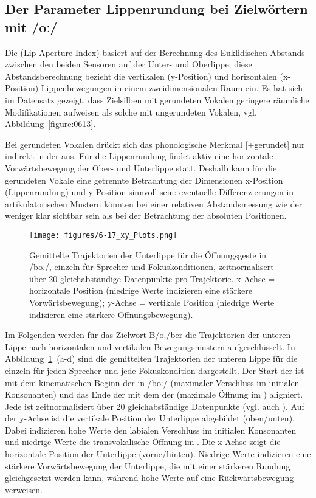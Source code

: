 \subsection{Der Parameter Lippenrundung bei Zielwörtern mit /oː/}
\label{subsec:060305}

Die  (Lip-Aperture-Index) basiert auf der Berechnung des Euklidischen Abstands zwischen den beiden Sensoren auf der Unter- und Oberlippe; diese Abstandsberechnung bezieht die vertikalen (y-Position) und horizontalen (x-Position) Lippenbewegungen in einem zweidimensionalen Raum ein. Es hat sich im Datensatz gezeigt, dass Zielsilben mit gerundeten Vokalen geringere räumliche Modifikationen aufweisen als solche mit ungerundeten Vokalen, vgl. Abbildung~\ref{figure:0613}.

Bei gerundeten Vokalen drückt sich das phonologische Merkmal [+gerundet] nur indirekt in der  aus. Für die Lippenrundung findet aktiv eine horizontale Vorwärtsbewegung der Ober- und Unterlippe statt. Deshalb kann für die gerundeten Vokale eine getrennte Betrachtung der Dimensionen x-Position (Lippenrundung) und y-Position sinnvoll sein: eventuelle Differenzierungen in artikulatorischen Mustern könnten bei einer relativen Abstandsmessung wie der  weniger klar sichtbar sein als bei der Betrachtung der absoluten Positionen.

\begin{figure}[p]
	\texttt{[image: figures/6-17\_xy\_Plots.png]}
	\caption{Gemittelte Trajektorien der Unterlippe für die Öffnungsgeste in /boː/, einzeln für Sprecher und Fokuskonditionen, zeitnormalisert über 20 gleichabständige Datenpunkte pro Trajektorie. x-Achse = horizontale Position (niedrige Werte indizieren eine stärkere Vorwärtsbewegung); y-Achse = vertikale Position (niedrige Werte indizieren eine stärkere Öffnungsbewegung).}
	\label{figure:0615}
\end{figure}

Im Folgenden werden für das Zielwort B/oː/ber die Trajektorien der unteren Lippe nach horizontalen und vertikalen Bewegungsmustern aufgeschlüsselt. In Abbildung~\ref{figure:0615}~(a-d) sind die gemittelten Trajektorien der unteren Lippe für die  einzeln für jeden Sprecher und jede Fokuskondition dargestellt. Der Start der  ist mit dem kinematischen Beginn der  in /boː/ (maximaler Verschluss im initialen Konsonanten) und das Ende der  mit dem  der  (maximale Öffnung im ) aligniert. Jede  ist zeitnormalisiert über 20 gleichabständige Datenpunkte (vgl. auch \citealt{Tabain2003b}). Auf der y-Achse ist die vertikale Position der Unterlippe abgebildet (oben/unten). Dabei indizieren hohe Werte den labialen Verschluss im initialen Konsonanten und niedrige Werte die transvokalische Öffnung im . Die x-Achse zeigt die horizontale Position der Unterlippe (vorne/hinten). Niedrige Werte indizieren eine stärkere Vorwärtsbewegung der Unterlippe, die mit einer stärkeren Rundung gleichgesetzt werden kann, während hohe Werte auf eine Rückwärtsbewegung verweisen.




